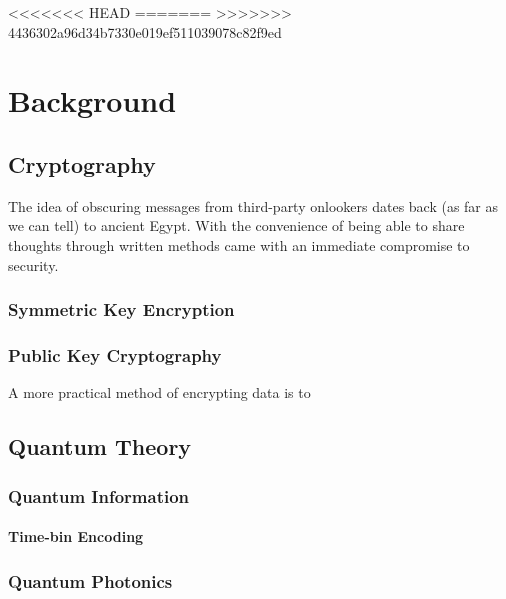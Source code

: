 %
%
<<<<<<< HEAD
\glsresetall
=======
\acresetall
>>>>>>> 4436302a96d34b7330e019ef511039078c82f9ed
\graphicspath{{./chapters/chapter02/fig02/}}

\let\textcircled=\pgftextcircled
\chapter{Background}
\label{chap:background}

\section{Cryptography}
\label{sec1:crypto}

The idea of obscuring messages from third-party onlookers dates back (as far as we can tell) to ancient Egypt. With the convenience of being able to share thoughts through written methods came with an immediate compromise to security.

\subsection{Symmetric Key Encryption}

\subsection{Public Key Cryptography}

A more practical method of encrypting data is to 

\section{Quantum Theory}

\subsection{Quantum Information}

\subsubsection{Time-bin Encoding}

\subsection{Quantum Photonics}

